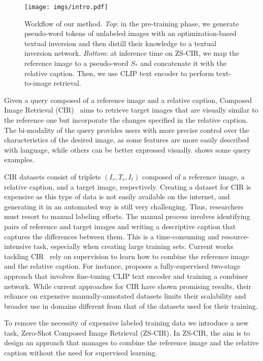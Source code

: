 \documentclass[10pt,twocolumn,letterpaper]{article}
\begin{document}
\begin{figure}
    \centering
    \texttt{[image: imgs/intro.pdf]}
    \caption{Workflow of our method. \textit{Top}: in the pre-training phase, we generate pseudo-word tokens of unlabeled images with an optimization-based textual inversion and then distill their knowledge to a textual inversion network. \textit{Bottom}: at inference time on ZS-CIR, we map the reference image to a pseudo-word $S_*$ and concatenate it with the relative caption. Then, we use CLIP text encoder to perform text-to-image retrieval.}
    \label{fig:intro}
\end{figure}

 Given a query composed of a reference image and a relative caption, Composed Image Retrieval (CIR)~\cite{vo2019composing, liu2021image} aims to retrieve target images that are visually similar to the reference one but incorporate the changes specified in the relative caption. The bi-modality of the query provides users with more precise control over the characteristics of the desired image, as some features are more easily described with language, while others can be better expressed visually.  shows some query examples.

CIR datasets consist of triplets $(I_r, T_r, I_t)$ composed of a reference image, a relative caption, and a target image, respectively. Creating a dataset for CIR is expensive as this type of data is not easily available on the internet, and generating it in an automated way is still very challenging. Thus, researchers must resort to manual labeling efforts. The manual process involves identifying pairs of reference and target images and writing a descriptive caption that captures the differences between them. This is a time-consuming and resource-intensive task, especially when creating large training sets. Current works tackling CIR~\cite{baldrati2022conditioned, baldrati2022effective, delmasartemis, liu2021image, lee2021cosmo} rely on supervision to learn how to combine the reference image and the relative caption. For instance, \cite{baldrati2022conditioned} proposes a fully-supervised two-stage approach that involves fine-tuning CLIP text encoder and training a combiner network. While current approaches for CIR have shown promising results, their reliance on expensive manually-annotated datasets limits their scalability and broader use in domains different from that of the datasets used for their training.

To remove the necessity of expensive labeled training data we introduce a new task, Zero-Shot Composed Image Retrieval (ZS-CIR). In ZS-CIR, the aim is to design an approach that manages to combine the reference image and the relative caption without the need for supervised learning. 
\end{document}
